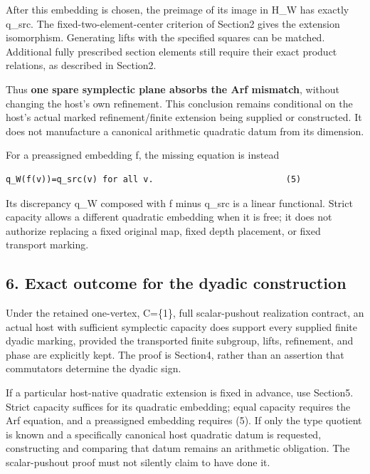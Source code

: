 After this embedding is chosen, the preimage of its image in H\_W has
exactly q\_src. The fixed-two-element-center criterion of Section2 gives
the extension isomorphism. Generating lifts with the specified squares
can be matched. Additional fully prescribed section elements still
require their exact product relations, as described in Section2.

Thus \textbf{one spare symplectic plane absorbs the Arf mismatch},
without changing the host's own refinement. This conclusion remains
conditional on the host's actual marked refinement/finite extension
being supplied or constructed. It does not manufacture a canonical
arithmetic quadratic datum from its dimension.

For a preassigned embedding f, the missing equation is instead

\begin{Verbatim}[fontsize=\small,breaklines=true,breakanywhere=true]
q_W(f(v))=q_src(v) for all v.                          (5)
\end{Verbatim}

Its discrepancy q\_W composed with f minus q\_src is a linear
functional. Strict capacity allows a different quadratic embedding when
it is free; it does not authorize replacing a fixed original map, fixed
depth placement, or fixed transport marking.

\hypertarget{dyadic_markings-exact-outcome-for-the-dyadic-construction}{%
\subsection{6. Exact outcome for the dyadic
construction}\label{dyadic_markings-exact-outcome-for-the-dyadic-construction}}

Under the retained one-vertex, C=\{1\}, full scalar-pushout realization
contract, an actual host with sufficient symplectic capacity does
support every supplied finite dyadic marking, provided the transported
finite subgroup, lifts, refinement, and phase are explicitly kept. The
proof is Section4, rather than an assertion that commutators determine
the dyadic sign.

If a particular host-native quadratic extension is fixed in advance, use
Section5. Strict capacity suffices for its quadratic embedding; equal
capacity requires the Arf equation, and a preassigned embedding requires
(5). If only the type quotient is known and a specifically canonical
host quadratic datum is requested, constructing and comparing that datum
remains an arithmetic obligation. The scalar-pushout proof must not
silently claim to have done it.

